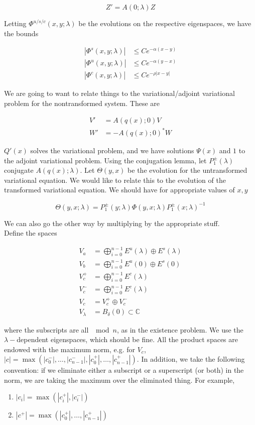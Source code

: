 \documentclass[12pt]{article}
\def\C{{\mathbb C}}
\begin{document}
\[
Z' = A(0; \lambda) Z
\]

Letting $\Phi^{u/s/c}(x, y; \lambda)$ be the evolutions on the respective eigenspaces, we have the bounds

\begin{align*}
|\Phi^s(x, y; \lambda)| &\leq C e^{-\alpha(x - y)} \\
|\Phi^u(x, y; \lambda)| &\leq C e^{-\alpha(y - x)} \\
|\Phi^c(x, y; \lambda)| &\leq C e^{-\rho|x - y|} 
\end{align*}

We are going to want to relate things to the variational/adjoint variational problem for the nontransformed system. These are

\begin{align*}
V' &= A(q(x); 0) V \\
W' &= -A(q(x); 0)^* W
\end{align*}

$Q'(x)$ solves the variational problem, and we have solutions $\Psi(x)$ and $1$ to the adjoint variational problem. Using the conjugation lemma, let $P_1^\pm(\lambda)$ conjugate $A(q(x); \lambda)$. Let $\Theta(y, x)$ be the evolution for the untransformed variational equation. We would like to relate this to the evolution of the transformed variational equation. We should have for appropriate values of $x, y$

\[
\Theta(y, x; \lambda) = P_1^\pm(y; \lambda) \Phi(y, x; \lambda) P_1^\pm(x; \lambda)^{-1}
\]

We can also go the other way by multiplying by the appropriate stuff.\\

Define the spaces

\begin{align*}
V_a &= \bigoplus_{i=0}^{n-1} E^u(\lambda) \oplus E^s(\lambda) \\
V_b &= \bigoplus_{i=0}^{n-1} E^u(0) \oplus E^s(0) \\
V_c^+ &= \bigoplus_{i=0}^{n-1} E^c(\lambda) \\
V_c^- &= \bigoplus_{i=0}^{n-1} E^c(\lambda) \\
V_c &= V_c^+ \oplus V_c^- \\
V_\lambda &= B_\delta(0) \subset \C
\end{align*}

where the subscripts are all $\mod n$, as in the existence problem. We use the $\lambda-$dependent eigenspaces, which should be fine. All the product spaces are endowed with the maximum norm, e.g. for $V_c$, $|c| = \max(|c_0^-|, \dots, |c_{n-1}^-|, |c_0^+|, \dots, |c_{n-1}^+|)$. In addition, we take the following convention: if we eliminate either a subscript or a superscript (or both) in the norm, we are taking the maximum over the eliminated thing. For example,
\begin{enumerate}
	\item $|c_i| = \max(|c_i^+|, |c_i^-|)$ 
	\item $|c^+| = \max(|c_0^+|, \dots, |c_{n-1}^+|)$
\end{enumerate}
\end{document}
